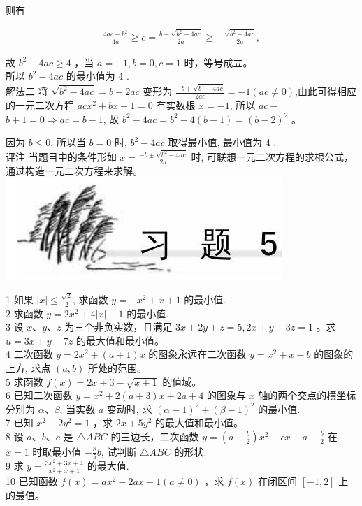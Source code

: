 \documentclass[10pt]{article}
\begin{document}
则有

\begin{align*}
\frac{4 a c-b^{2}}{4 a} \geqslant c=\frac{b-\sqrt{b^{2}-4 a c}}{2 a} \geqslant-\frac{\sqrt{b^{2}-4 a c}}{2 a},
\end{align*}

故 $b^{2}-4 a c \geqslant 4$ ，当 $a=-1, b=0, c=1$ 时，等号成立。\\
所以 $b^{2}-4 a c$ 的最小值为 4 .\\
解法二 将 $\sqrt{b^{2}-4 a c}=b-2 a c$ 变形为 $\frac{-b+\sqrt{b^{2}-4 a c}}{2 a c}=-1(a c \neq 0)$,由此可得相应的一元二次方程 $a c x^{2}+b x+1=0$ 有实数根 $x=-1$, 所以 $a c-$ $b+1=0 \Rightarrow a c=b-1$, 故 $b^{2}-4 a c=b^{2}-4(b-1)=(b-2)^{2}$ 。

因为 $b \leqslant 0$, 所以当 $b=0$ 时, $b^{2}-4 a c$ 取得最小值, 最小值为 4 .\\
评注 当题目中的条件形如 $x=\frac{-b \pm \sqrt{b^{2}-4 a c}}{2 a}$ 时, 可联想一元二次方程的求根公式，通过构造一元二次方程来求解。\\
\includegraphics[max width=\textwidth, center]{2024_10_30_1bf34f7aeb61f11d11d3g-079}

1 如果 $|x| \leqslant \frac{\sqrt{2}}{2}$, 求函数 $y=-x^{2}+x+1$ 的最小值.\\
2 求函数 $y=2 x^{2}+4|x|-1$ 的最小值.\\
3 设 $x 、 y 、 z$ 为三个非负实数，且满足 $3 x+2 y+z=5,2 x+y-3 z=1$ 。求 $u=3 x+y-7 z$ 的最大值和最小值。\\
4 二次函数 $y=2 x^{2}+(a+1) x$ 的图象永远在二次函数 $y=x^{2}+x-b$ 的图象的上方, 求点 $(a, b)$ 所处的范围。\\
5 求函数 $f(x)=2 x+3-\sqrt{x+1}$ 的值域。\\
6 已知二次函数 $y=x^{2}+2(a+3) x+2 a+4$ 的图象与 $x$ 轴的两个交点的横坐标分别为 $\alpha 、 \beta$, 当实数 $a$ 变动时, 求 $(\alpha-1)^{2}+(\beta-1)^{2}$ 的最小值.\\
7 已知 $x^{2}+2 y^{2}=1$ ，求 $2 x+5 y^{2}$ 的最大值和最小值。\\
8 设 $a 、 b 、 c$ 是 $\triangle A B C$ 的三边长，二次函数 $y=\left(a-\frac{b}{2}\right) x^{2}-c x-a-\frac{b}{2}$ 在 $x=1$ 时取最小值 $-\frac{8}{5} b$, 试判断 $\triangle A B C$ 的形状.\\
9 求 $y=\frac{3 x^{2}+3 x+4}{x^{2}+x+1}$ 的最大值.\\
10 已知函数 $f(x)=a x^{2}-2 a x+1(a \neq 0)$ ，求 $f(x)$ 在闭区间 $[-1,2]$ 上的最值。
\end{document}
